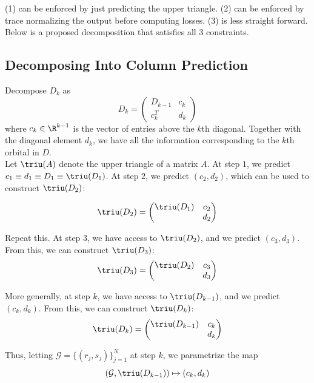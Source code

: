 \documentclass[12pt]{article}
\begin{document}
    (1) can be enforced by just predicting the upper triangle. (2) can be enforced by trace normalizing the output before computing losses. (3) is less straight forward. Below is a proposed decomposition that satisfies all 3 constraints. 

    \subsection{Decomposing Into Column Prediction}
    Decompose $D_k$ as
    \begin{equation}
        D_k = \begin{pmatrix}
            D_{k-1} & c_k \\
            c_k^T & d_k
        \end{pmatrix}
    \end{equation}
    where $c_k \in \R^{k-1}$ is the vector of entries above the $k$th diagonal. Together with the diagonal element $d_k$, we have all the information corresponding to the $k$th orbital in $D$. \\[-6pt]
    
    Let $\triu (A)$ denote the upper triangle of a matrix $A$. At step $1$, we predict $c_1 \equiv d_1 \equiv D_1 \equiv \triu(D_1)$. At step $2$, we predict $(c_2, d_2)$, which can be used to construct $\triu(D_2)$:

    \[ \triu(D_2) = \begin{pmatrix}
        \triu(D_1) & c_2 \\
        & d_2
    \end{pmatrix}\]

    Repeat this. At step 3, we have access to $\triu(D_2)$, and we predict $(c_3, d_3)$. From this, we can construct $\triu(D_3)$:
    \[
    \triu(D_3) = \begin{pmatrix}
        \triu(D_2) & c_3 \\
        & d_3
    \end{pmatrix}
    \]
    
    More generally, at step $k$, we have access to $\triu(D_{k-1})$, and we predict $(c_k, d_k)$. From this, we can construct $\triu(D_k)$:
    \[ \triu(D_k) = \begin{pmatrix}
        \triu(D_{k-1}) & c_k \\
        & d_k
    \end{pmatrix}\]
    
    Thus, letting $\mathcal{G} = \{(r_j, s_j)\}_{j=1}^N$ at step $k$, we parametrize the map
    \begin{equation}
        (\mathcal{G}, \triu(D_{k-1}) ) \mapsto (c_k, d_k)
    \end{equation}
\end{document}
